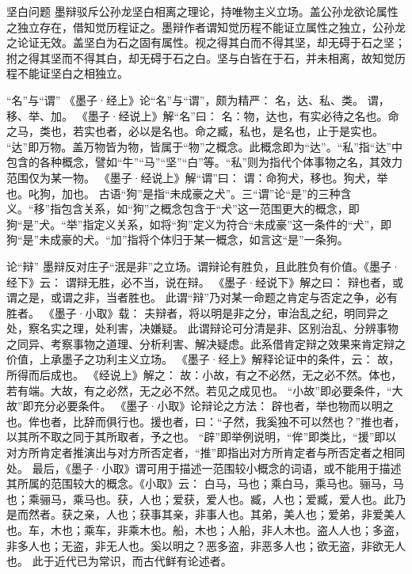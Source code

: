 \documentclass[11pt]{article}
\begin{document}
坚白问题
墨辩驳斥公孙龙坚白相离之理论，持唯物主义立场。盖公孙龙欲论属性之独立存在，借知觉历程证之。墨辩作者谓知觉历程不能证立属性之独立，公孙龙之论证无效。盖坚白为石之固有属性。视之得其白而不得其坚，却无碍于石之坚；拊之得其坚而不得其白，却无碍于石之白。坚与白皆在于石，并未相离，故知觉历程不能证坚白之相独立。

“名”与“谓”
《墨子·经上》论“名”与“谓”，颇为精严：
名，达、私、类。
谓，移、举、加。
《墨子·经说上》解“名”曰：
名：物，达也，有实必待之名也。命之马，类也，若实也者，必以是名也。命之臧，私也，是名也，止于是实也。
“达”即万物。盖万物皆为物，皆属于“物”之概念。此概念即为“达”。“私”指“达”中包含的各种概念，譬如“牛”“马”“坚”“白”等。“私”则为指代个体事物之名，其效力范围仅为某一物。
《墨子·经说上》解“谓”曰：
谓：命狗犬，移也。狗犬，举也。叱狗，加也。
古语“狗”是指“未成豪之犬”。三“谓”论“是”的三种含义。“移”指包含关系，如“狗”之概念包含于“犬”这一范围更大的概念，即狗“是”犬。“举”指定义关系，如将“狗”定义为符合“未成豪”这一条件的“犬”，即狗“是”未成豪的犬。“加”指将个体归于某一概念，如言这“是”一条狗。

论“辩”
    墨辩反对庄子“泯是非”之立场。谓辩论有胜负，且此胜负有价值。《墨子·经下》云：
    谓辩无胜，必不当，说在辩。
《墨子·经说下》解之曰：
辩也者，或谓之是，或谓之非，当者胜也。
此谓“辩”乃对某一命题之肯定与否定之争，必有胜者。
《墨子·小取》载：
夫辩者，将以明是非之分，审治乱之纪，明同异之处，察名实之理，处利害，决嫌疑。
此谓辩论可分清是非、区别治乱、分辨事物之同异、考察事物之道理、分析利害、解决疑虑。此系借肯定辩之效果来肯定辩之价值，上承墨子之功利主义立场。
《墨子·经上》解释论证中的条件，云：
故，所得而后成也。
《经说上》解之：
    故：小故，有之不必然，无之必不然。体也，若有端。大故，有之必然，无之必不然。若见之成见也。
“小故”即必要条件，“大故”即充分必要条件。
《墨子·小取》论辩论之方法：
辟也者，举也物而以明之也。侔也者，比辞而俱行也。援也者，曰：“子然，我奚独不可以然也？”推也者，以其所不取之同于其所取者，予之也。
“辟”即举例说明，“侔”即类比，“援”即以对方所肯定者推演出与对方所否定者，“推”即指出对方所肯定者与所否定者之相同处。
最后，《墨子·小取》谓可用于描述一范围较小概念的词语，或不能用于描述其所属的范围较大的概念。《小取》云：
白马，马也；乘白马，乘马也。骊马，马也；乘骊马，乘马也。获，人也；爱获，爱人也。臧，人也；爱臧，爱人也。此乃是而然者。获之亲，人也；获事其亲，非事人也。其弟，美人也；爱弟，非爱美人也。车，木也；乘车，非乘木也。船，木也；人船，非人木也。盗人人也；多盗，非多人也；无盗，非无人也。奚以明之？恶多盗，非恶多人也；欲无盗，非欲无人也。
此于近代已为常识，而古代鲜有论述者。
\end{document}
